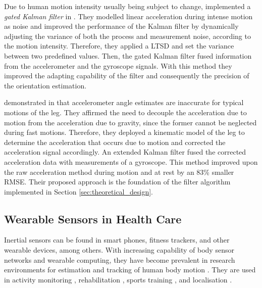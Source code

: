 Due to human motion intensity usually being subject to change, \citeauthor{olivares_vicente_signal_2013} implemented a \emph{gated Kalman filter} in \cite{olivares_vicente_signal_2013}. They modelled linear acceleration during intense motion as noise and improved the performance of the Kalman filter by dynamically adjusting the variance of both the process and measurement noise, according to the motion intensity. Therefore, they applied a \gls{LTSD} and set the variance between two predefined values. Then, the gated Kalman filter fused information from the accelerometer and the gyroscope signals. With this method they improved the adapting capability of the filter and consequently the precision of the orientation estimation.

\citeauthor{bennett_motion_2014} demonstrated in \cite{bennett_motion_2014} that accelerometer angle estimates are inaccurate for typical motions of the leg. They affirmed the need to decouple the acceleration due to motion from the acceleration due to gravity, since the former cannot be neglected during fast motions. Therefore, they deployed a kinematic model of the leg to determine the acceleration that occurs due to motion and corrected the acceleration signal accordingly. An extended Kalman filter fused the corrected acceleration data with measurements of a gyroscope. This method improved upon the raw acceleration method during motion and at rest by an 83\% smaller \gls{RMSE}. Their proposed approach is the foundation of the filter algorithm implemented in Section \ref{sec:theoretical_design}.

\subsection{Wearable Sensors in Health Care}\label{sec:MARG_sensors_medical}

Inertial sensors can be found in smart phones, fitness trackers, and other wearable devices, among others. With increasing capability of body sensor networks and wearable computing, they have become prevalent in research environments for estimation and tracking of human body motion \cite{bennett_motion_2014}. They are used in activity monitoring \cite{veltink_detection_96, najafi_ambulatory_03, ermes_sports_08}, rehabilitation \cite{giggins_rehabilitation_13, lupinski_ligament_11}, sports training \cite{bonnet_squat_13, ermes_sports_08}, and localisation \cite{hoflinger_localization_13, Bennett_distance_13}.

